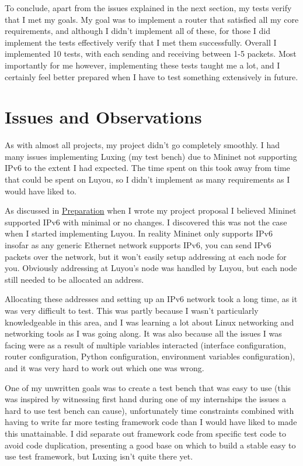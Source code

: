 \documentclass[12pt,a4paper,twoside,openright]{report}
\begin{document}
\bigskip

To conclude, apart from the issues explained in the next section, my tests verify that I met my goals.  My goal was to implement a router that satisfied all my core requirements, and although I didn't implement all of these, for those I did implement the tests effectively verify that I met them successfully.  Overall I implemented 10 tests, with each sending and receiving between 1-5 packets. Most importantly for me however, implementing these tests taught me a lot, and I certainly feel better prepared when I have to test something extensively in future.

\section{Issues and Observations}

As with almost all projects, my project didn't go completely smoothly. I had many issues implementing Luxing (my test bench) due to Mininet not supporting IPv6 to the extent I had expected. The time spent on this took away from time that could be spent on Luyou, so I didn't implement as many requirements as I would have liked to.

\bigskip

As discussed in \hyperref[chap::preparation]{Preparation} when I wrote my project proposal I believed Mininet supported IPv6 with minimal or no changes.  I discovered this was not the case when I started implementing Luyou.  In reality Mininet only supports IPv6 insofar as any generic Ethernet network supports IPv6, you can send IPv6 packets over the network, but it won't easily setup addressing at each node for you.  Obviously addressing at Luyou's node was handled by Luyou, but each node still needed to be allocated an address. 

Allocating these addresses and setting up an IPv6 network took a long time, as it was very difficult to test.  This was partly because I wasn't particularly knowledgeable in this area, and I was learning a lot about Linux networking and networking tools as I was going along. It was also because all the issues I was facing were as a result of multiple variables interacted (interface configuration, router configuration, Python configuration, environment variables configuration), and it was very hard to work out which one was wrong.  

One of my unwritten goals was to create a test bench that was easy to use (this was inspired by witnessing first hand during one of my internships the issues a hard to use test bench can cause), unfortunately time constraints combined with having to write far more testing framework code than I would have liked to made this unattainable.  I did separate out framework code from specific test code to avoid code duplication, presenting a good base on which to build a stable easy to use test framework, but Luxing isn't quite there yet. 
\end{document}
